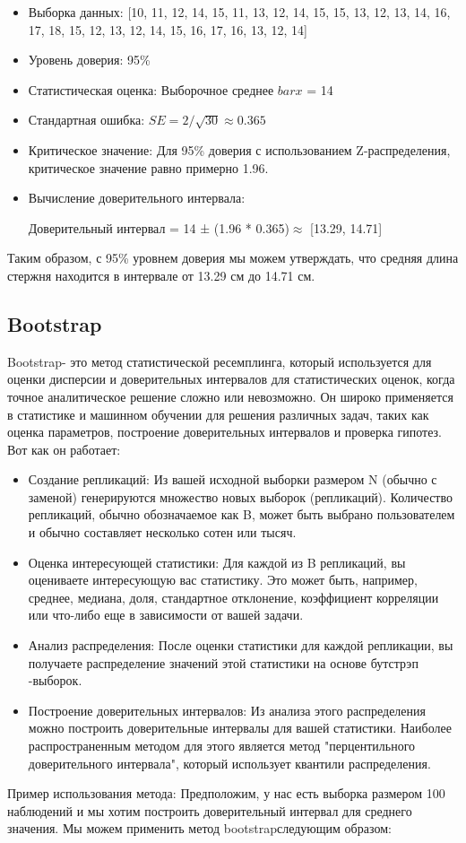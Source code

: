\documentclass[specialist,
               substylefile = spbu_report.rtx,
               subf,href,colorlinks=true, 12pt]{disser}
\begin{document}
\begin{itemize}
    \item Выборка данных: [10, 11, 12, 14, 15, 11, 13, 12, 14, 15, 15, 13, 12, 13, 14, 16, 17, 18, 15, 12, 13, 12, 14, 15, 16, 17, 16, 13, 12, 14]
    \item Уровень доверия: 95\%
    \item Статистическая оценка: Выборочное среднее $bar{x}$ = 14
    \item Стандартная ошибка: $SE = 2 / \sqrt{30} \approx 0.365$
    \item Критическое значение: Для 95\% доверия с использованием Z-распределения, критическое значение равно примерно 1.96.
    \item Вычисление доверительного интервала: 
    
    Доверительный интервал = 14 ± (1.96 * 0.365)$ \approx $ [13.29, 14.71]
    \end{itemize}
    Таким образом, с 95\% уровнем доверия мы можем утверждать, что средняя длина стержня находится в интервале от 13.29 см до 14.71 см.

\subsection{Bootstrap}
Bootstrap- это метод статистической ресемплинга, который используется для оценки дисперсии и доверительных интервалов для статистических оценок, когда точное аналитическое решение сложно или невозможно. Он широко применяется в статистике и машинном обучении для решения различных задач, таких как оценка параметров, построение доверительных интервалов и проверка гипотез. Вот как он работает:
\begin{itemize}
    \item Создание репликаций: Из вашей исходной выборки размером N (обычно с заменой) генерируются множество новых выборок (репликаций). Количество репликаций, обычно обозначаемое как B, может быть выбрано пользователем и обычно составляет несколько сотен или тысяч.
    \item Оценка интересующей статистики: Для каждой из B репликаций, вы оцениваете интересующую вас статистику. Это может быть, например, среднее, медиана, доля, стандартное отклонение, коэффициент корреляции или что-либо еще в зависимости от вашей задачи.
    \item Анализ распределения: После оценки статистики для каждой репликации, вы получаете распределение значений этой статистики на основе бутстрэп -выборок.
    \item Построение доверительных интервалов: Из анализа этого распределения можно построить доверительные интервалы для вашей статистики. Наиболее распространенным методом для этого является метод "перцентильного доверительного интервала", который использует квантили распределения.
\end{itemize}
Пример использования метода:
\newline
Предположим, у нас есть выборка размером 100 наблюдений и мы хотим построить доверительный интервал для среднего значения. Мы можем применить метод bootstrapследующим образом:
\end{document}
